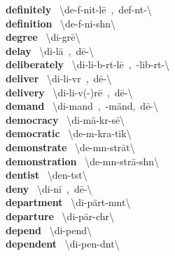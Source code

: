 \documentclass[10pt,a4paper]{article}
\begin{document}
\begin{multicols}{2}
\textbf{ definitely }\quad \ \textbackslash \textprimstress de-f\textschwa -nit-l\={e}\ ,\ \textprimstress def-n\textschwa t-\textbackslash \\
\textbf{ definition }\quad \ \textbackslash \textsecstress de-f\textschwa -\textprimstress ni-sh\textschwa n\textbackslash \\
\textbf{ degree }\quad \ \textbackslash di-\textprimstress gr\={e}\textbackslash \\
\textbf{ delay }\quad \ \textbackslash di-\textprimstress l\={a}\ ,\ d\={e}-\textbackslash \\
\textbf{ deliberately }\quad \ \textbackslash di-\textprimstress li-b\textschwa -r\textschwa t-l\={e}\ ,\ -\textprimstress lib-r\textschwa t-\textbackslash \\
\textbf{ deliver }\quad \ \textbackslash di-\textprimstress li-v\textschwa r\ ,\ d\={e}-\textbackslash \\
\textbf{ delivery }\quad \ \textbackslash di-\textprimstress li-v(\textschwa -)r\={e}\ ,\ d\={e}-\textbackslash \\
\textbf{ demand }\quad \ \textbackslash di-\textprimstress mand\ ,\ -\textprimstress m\"{a}nd,\ d\={e}-\textbackslash \\
\textbf{ democracy }\quad \ \textbackslash di-\textprimstress m\"{a}-kr\textschwa -s\={e}\textbackslash \\
\textbf{ democratic }\quad \ \textbackslash \textsecstress de-m\textschwa -\textprimstress kra-tik\textbackslash \\
\textbf{ demonstrate }\quad \ \textbackslash \textprimstress de-m\textschwa n-\textsecstress str\={a}t\textbackslash \\
\textbf{ demonstration }\quad \ \textbackslash \textsecstress de-m\textschwa n-\textprimstress str\={a}-sh\textschwa n\textbackslash \\
\textbf{ dentist }\quad \ \textbackslash \textprimstress den-t\textschwa st\textbackslash \\
\textbf{ deny }\quad \ \textbackslash di-\textprimstress n\={i}\ ,\ d\={e}-\textbackslash \\
\textbf{ department }\quad \ \textbackslash di-\textprimstress p\"{a}rt-m\textschwa nt\textbackslash \\
\textbf{ departure }\quad \ \textbackslash di-\textprimstress p\"{a}r-ch\textschwa r\textbackslash \\
\textbf{ depend }\quad \ \textbackslash di-\textprimstress pend\textbackslash \\
\textbf{ dependent }\quad \ \textbackslash di-\textprimstress pen-d\textschwa nt\textbackslash \\

\end{multicols}
\end{document}
